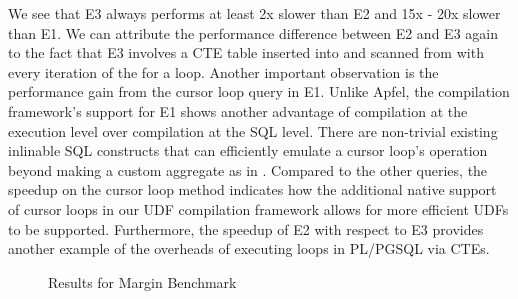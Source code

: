 \documentclass[12pt]{cmuthesis}
\begin{document}
        We see that E3 always performs at least
        2x slower than E2 and 15x - 20x slower than E1. We can attribute the performance difference between
        E2 and E3 again to the fact that E3 involves a CTE table inserted into and scanned from with every iteration of the for a loop. Another important observation is the performance gain from the cursor loop query in E1. Unlike Apfel, the compilation framework's support for E1 shows
        another advantage of compilation at the execution level over compilation at the SQL level. There are non-trivial existing inlinable SQL constructs that can efficiently emulate a cursor loop's operation beyond making a
        custom aggregate as in \cite{gupta20}. Compared to the other queries, the speedup on the cursor loop method indicates how the additional native support of cursor loops in our UDF compilation framework allows for more efficient UDFs to be supported. Furthermore, the speedup of E2 with respect to E3 provides another example of
        the overheads of executing loops in PL/PGSQL via CTEs.\\

        \begin{figure}[!h]
            \centering
            \caption{Results for Margin Benchmark}
            \label{fig:margin}
          \end{figure}
        
\end{document}
